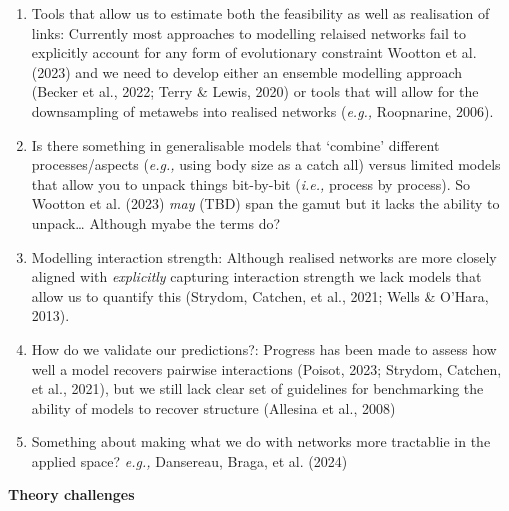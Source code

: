 \documentclass[
]{article}
\providecommand{\tightlist}{%
  \setlength{\itemsep}{0pt}\setlength{\parskip}{0pt}}\usepackage{longtable,booktabs,array}
\begin{document}
\begin{enumerate}
\def\labelenumi{\arabic{enumi}.}
\tightlist
\item
  Tools that allow us to estimate both the feasibility as well as
  realisation of links: Currently most approaches to modelling relaised
  networks fail to explicitly account for any form of evolutionary
  constraint Wootton et al. (2023) and we need to develop either an
  ensemble modelling approach (Becker et al., 2022; Terry \& Lewis,
  2020) or tools that will allow for the downsampling of metawebs into
  realised networks (\emph{e.g.,} Roopnarine, 2006).
\item
  Is there something in generalisable models that `combine' different
  processes/aspects (\emph{e.g.,} using body size as a catch all) versus
  limited models that allow you to unpack things bit-by-bit
  (\emph{i.e.,} process by process). So Wootton et al. (2023) \emph{may}
  (TBD) span the gamut but it lacks the ability to unpack\ldots{}
  Although myabe the terms do?
\item
  Modelling interaction strength: Although realised networks are more
  closely aligned with \emph{explicitly} capturing interaction strength
  we lack models that allow us to quantify this (Strydom, Catchen, et
  al., 2021; Wells \& O'Hara, 2013).
\item
  How do we validate our predictions?: Progress has been made to assess
  how well a model recovers pairwise interactions (Poisot, 2023;
  Strydom, Catchen, et al., 2021), but we still lack clear set of
  guidelines for benchmarking the ability of models to recover structure
  (Allesina et al., 2008)
\item
  Something about making what we do with networks more tractablie in the
  applied space? \emph{e.g.,} Dansereau, Braga, et al. (2024)
\end{enumerate}

\textbf{Theory challenges}
\end{document}
